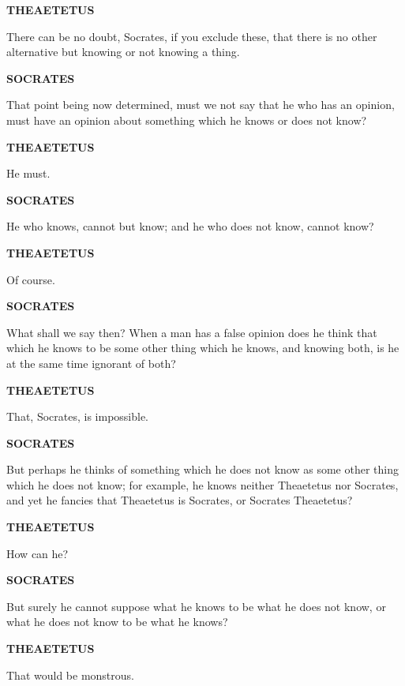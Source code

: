 \documentclass[11pt,letter]{article}
\begin{document}
\par \textbf{THEAETETUS}
\par   There can be no doubt, Socrates, if you exclude these, that there is no other alternative but knowing or not knowing a thing.

\par \textbf{SOCRATES}
\par   That point being now determined, must we not say that he who has an opinion, must have an opinion about something which he knows or does not know?

\par \textbf{THEAETETUS}
\par   He must.

\par \textbf{SOCRATES}
\par   He who knows, cannot but know; and he who does not know, cannot know?

\par \textbf{THEAETETUS}
\par   Of course.

\par \textbf{SOCRATES}
\par   What shall we say then? When a man has a false opinion does he think that which he knows to be some other thing which he knows, and knowing both, is he at the same time ignorant of both?

\par \textbf{THEAETETUS}
\par   That, Socrates, is impossible.

\par \textbf{SOCRATES}
\par   But perhaps he thinks of something which he does not know as some other thing which he does not know; for example, he knows neither Theaetetus nor Socrates, and yet he fancies that Theaetetus is Socrates, or Socrates Theaetetus?

\par \textbf{THEAETETUS}
\par   How can he?

\par \textbf{SOCRATES}
\par   But surely he cannot suppose what he knows to be what he does not know, or what he does not know to be what he knows?

\par \textbf{THEAETETUS}
\par   That would be monstrous.
\end{document}
